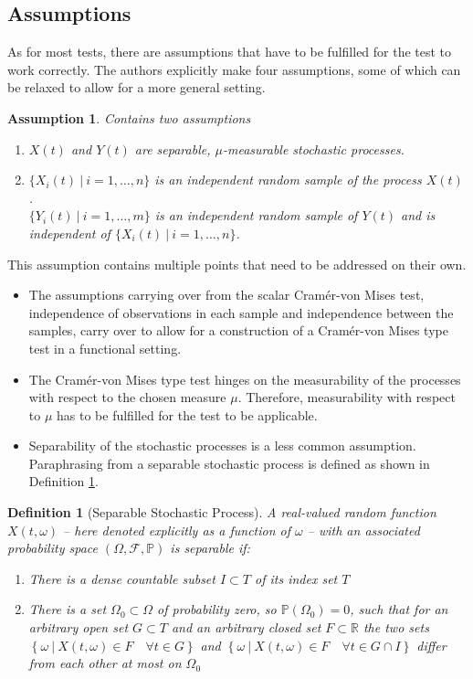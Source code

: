 \documentclass[12pt, a4paper]{article}
\theoremstyle{MAstyle} \newtheorem{assumption}{Assumption}[section]
\theoremstyle{MAstyle} \newtheorem{definition}{Definition}[section]
\theoremstyle{MAstyle} \newtheorem{theorem}{Theorem}[section]
\begin{document}
		\subsection{Assumptions}
		As for most tests, there are assumptions that have to be fulfilled for the test to work correctly. The authors explicitly make four assumptions, some of which can be relaxed to allow for a more general setting.
			\begin{assumption} Contains two assumptions
				\begin{enumerate}
					\item $X(t)$ and $Y(t)$ are separable, $\mu$-measurable stochastic processes.
					\item $\{X_i(t) \: \vert \: i = 1, \dots, n\}$ is an independent random sample of the process $X(t)$. \\
					$\{Y_i(t) \: \vert \: i = 1, \dots, m\}$ is an independent random sample of $Y(t)$ and is independent of $\{X_i(t) \: \vert \: i = 1, \dots, n\}$.
				\end{enumerate}
			\end{assumption}
		This assumption contains multiple points that need to be addressed on their own.
			\begin{itemize}
				\item The assumptions carrying over from the scalar Cram\'{e}r-von Mises test, independence of observations in each sample and independence between the samples, carry over to allow for a construction of a Cram\'{e}r-von Mises type test in a functional setting.
				\item The Cram\'{e}r-von Mises type test hinges on the measurability of the processes with respect to the chosen measure $\mu$. Therefore, measurability with respect to $\mu$ has to be fulfilled for the test to be applicable.
				\item Separability of the stochastic processes is a less common assumption. Paraphrasing from \cite{gihman_theory_2004} a separable stochastic process is defined as shown in Definition \ref{separability}.
			\end{itemize}
			\begin{definition}[Separable Stochastic Process]\label{separability}
				A real-valued random function $X(t, \omega)$ -- here denoted explicitly as a function of $\omega$ -- with an associated probability space $\left(\Omega, \mathcal{F}, \mathbb{P}\right)$ is separable if:
				\begin{enumerate}
					\item There is a dense countable subset $I \subset T$ of its index set $T$
					\item There is a set $\Omega_0 \subset \Omega$ of probability zero, so $\mathbb{P}\left(\Omega_0\right) = 0$, such that for an arbitrary open set $G \subset T$ and an arbitrary closed set $F \subset \mathbb{R}$ the two sets $\left\{\omega \ \vert \ X(t, \omega) \in F \quad \forall t \in G\right\}$ and $\left\{\omega \ \vert \ X(t, \omega) \in F \quad \forall t \in G \cap I\right\}$ differ from each other at most on $\Omega_0$
				\end{enumerate}      
			\end{definition}
\end{document}
